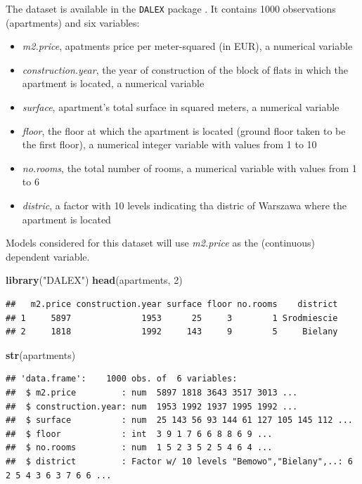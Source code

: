 \documentclass[12pt,]{krantz}
\newenvironment{Shaded}{\begin{snugshade}}{\end{snugshade}}
\newcommand{\DecValTok}[1]{\textcolor[rgb]{0.00,0.00,0.81}{#1}}
\newcommand{\KeywordTok}[1]{\textcolor[rgb]{0.13,0.29,0.53}{\textbf{#1}}}
\newcommand{\NormalTok}[1]{#1}
\newcommand{\StringTok}[1]{\textcolor[rgb]{0.31,0.60,0.02}{#1}}
\providecommand{\tightlist}{%
  \setlength{\itemsep}{0pt}\setlength{\parskip}{0pt}}
\theoremstyle{definition}
\theoremstyle{definition}
\theoremstyle{definition}
\theoremstyle{remark}
\begin{document}
The dataset is available in the \texttt{DALEX} package \citep{R-DALEX}.
It contains 1000 observations (apartments) and six variables:

\begin{itemize}
\tightlist
\item
  \emph{m2.price}, apatments price per meter-squared (in EUR), a
  numerical variable
\item
  \emph{construction.year}, the year of construction of the block of
  flats in which the apartment is located, a numerical variable
\item
  \emph{surface}, apartment's total surface in squared meters, a
  numerical variable
\item
  \emph{floor}, the floor at which the apartment is located (ground
  floor taken to be the first floor), a numerical integer variable with
  values from 1 to 10
\item
  \emph{no.rooms}, the total number of rooms, a numerical variable with
  values from 1 to 6
\item
  \emph{distric}, a factor with 10 levels indicating tha distric of
  Warszawa where the apartment is located
\end{itemize}

Models considered for this dataset will use \emph{m2.price} as the
(continuous) dependent variable.

\begin{Shaded}
\begin{Highlighting}[]
\KeywordTok{library}\NormalTok{(}\StringTok{"DALEX"}\NormalTok{)}
\KeywordTok{head}\NormalTok{(apartments, }\DecValTok{2}\NormalTok{)}
\end{Highlighting}
\end{Shaded}

\begin{verbatim}
##   m2.price construction.year surface floor no.rooms    district
## 1     5897              1953      25     3        1 Srodmiescie
## 2     1818              1992     143     9        5     Bielany
\end{verbatim}

\begin{Shaded}
\begin{Highlighting}[]
\KeywordTok{str}\NormalTok{(apartments)}
\end{Highlighting}
\end{Shaded}

\begin{verbatim}
## 'data.frame':    1000 obs. of  6 variables:
##  $ m2.price         : num  5897 1818 3643 3517 3013 ...
##  $ construction.year: num  1953 1992 1937 1995 1992 ...
##  $ surface          : num  25 143 56 93 144 61 127 105 145 112 ...
##  $ floor            : int  3 9 1 7 6 6 8 8 6 9 ...
##  $ no.rooms         : num  1 5 2 3 5 2 5 4 6 4 ...
##  $ district         : Factor w/ 10 levels "Bemowo","Bielany",..: 6 2 5 4 3 6 3 7 6 6 ...
\end{verbatim}
\end{document}
